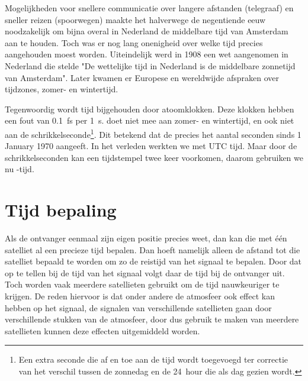 Mogelijkheden voor snellere communicatie over langere afstanden
(telegraaf) en sneller reizen (spoorwegen) maakte het halverwege de
negentiende eeuw noodzakelijk om bijna overal in Nederland de middelbare
tijd van Amsterdam aan te houden. Toch was er nog lang onenigheid over
welke tijd precies aangehouden moest worden. Uiteindelijk werd in 1908
een wet aangenomen in Nederland die stelde "De wettelijke tijd in
Nederland is de middelbare zonnetijd van Amsterdam". Later kwamen er
Europese en wereldwijde afspraken over tijdzones, zomer- en wintertijd.

Tegenwoordig wordt tijd bijgehouden door atoomklokken. Deze klokken
hebben een fout van \SI{0.1}{\femto\second} per \SI{1}{\second}. \gps
doet niet mee aan zomer- en wintertijd, en ook niet aan de
schrikkelseconde\footnote{Een extra seconde die af en toe aan de tijd
wordt toegevoegd ter correctie van het verschil tussen de zonnedag en de
\SI{24}{hour} die als dag gezien wordt.}. Dit betekend dat de \gps
precies het aantal seconden sinds 1 January 1970 aangeeft. In het
verleden werkten we met UTC tijd. Maar door de schrikkelseconden kan een
tijdstempel twee keer voorkomen, daarom gebruiken we nu \gps-tijd.


\section{Tijd bepaling}

Als de ontvanger eenmaal zijn eigen positie precies weet, dan kan die
met één satelliet al een precieze tijd bepalen. Dan hoeft namelijk
alleen de afstand tot die satelliet bepaald te worden om zo de reistijd
van het signaal te bepalen. Door dat op te tellen bij de tijd van het
signaal volgt daar de tijd bij de ontvanger uit. Toch worden vaak
meerdere satellieten gebruikt om de tijd nauwkeuriger te krijgen. De
reden hiervoor is dat onder andere de atmosfeer ook effect kan hebben op
het signaal, de signalen van verschillende satellieten gaan door
verschillende stukken van de atmosfeer, door dus gebruik te maken van
meerdere satellieten kunnen deze effecten uitgemiddeld worden.

